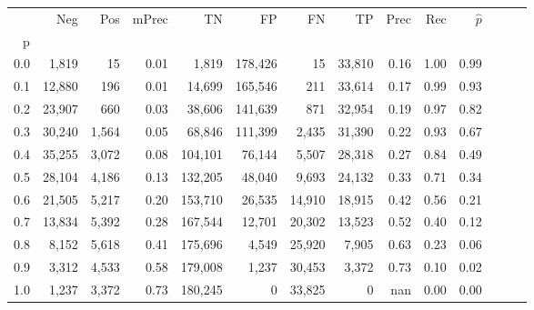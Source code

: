 \begin{tabular}{rrrrrrrrrrrrrr}
\toprule
{} &     Neg &    Pos & mPrec &       TN &       FP &      FN &      TP &  Prec &   Rec & $\hat{p}$ \\
p   &         &        &       &          &          &         &         &       &       &           \\
\midrule
0.0 &   1,819 &     15 &  0.01 &    1,819 &  178,426 &      15 &  33,810 &  0.16 &  1.00 &      0.99 \\
0.1 &  12,880 &    196 &  0.01 &   14,699 &  165,546 &     211 &  33,614 &  0.17 &  0.99 &      0.93 \\
0.2 &  23,907 &    660 &  0.03 &   38,606 &  141,639 &     871 &  32,954 &  0.19 &  0.97 &      0.82 \\
0.3 &  30,240 &  1,564 &  0.05 &   68,846 &  111,399 &   2,435 &  31,390 &  0.22 &  0.93 &      0.67 \\
0.4 &  35,255 &  3,072 &  0.08 &  104,101 &   76,144 &   5,507 &  28,318 &  0.27 &  0.84 &      0.49 \\
0.5 &  28,104 &  4,186 &  0.13 &  132,205 &   48,040 &   9,693 &  24,132 &  0.33 &  0.71 &      0.34 \\
0.6 &  21,505 &  5,217 &  0.20 &  153,710 &   26,535 &  14,910 &  18,915 &  0.42 &  0.56 &      0.21 \\
0.7 &  13,834 &  5,392 &  0.28 &  167,544 &   12,701 &  20,302 &  13,523 &  0.52 &  0.40 &      0.12 \\
0.8 &   8,152 &  5,618 &  0.41 &  175,696 &    4,549 &  25,920 &   7,905 &  0.63 &  0.23 &      0.06 \\
0.9 &   3,312 &  4,533 &  0.58 &  179,008 &    1,237 &  30,453 &   3,372 &  0.73 &  0.10 &      0.02 \\
1.0 &   1,237 &  3,372 &  0.73 &  180,245 &        0 &  33,825 &       0 &   nan &  0.00 &      0.00 \\
\bottomrule
\end{tabular}
